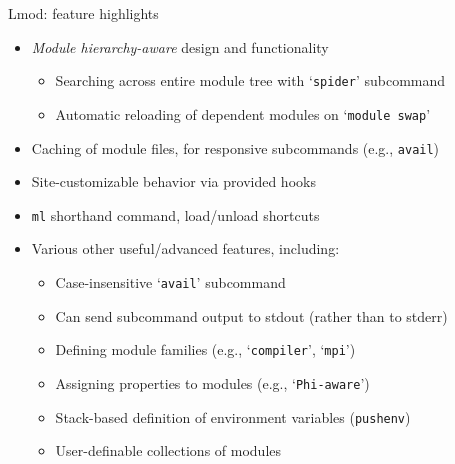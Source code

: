 \documentclass[10pt,xcolor={usenames,dvipsnames}]{beamer}
\begin{document}
\begin{frame}{Lmod: feature highlights}
\begin{itemize}
    \item
        \emph{Module hierarchy-aware} design and functionality
    \begin{itemize}
        \item
            Searching across entire module tree with `\texttt{spider}' subcommand
        \item
            Automatic reloading of dependent modules on `\texttt{module swap}'
    \end{itemize}
    \item
        Caching of module files, for responsive subcommands
        (e.g., \texttt{avail})
    \item
        Site-customizable behavior via provided hooks
    \item
        \texttt{ml} shorthand command, load/unload shortcuts
    \item
        Various other useful/advanced features, including:
    \begin{itemize}
        \item
            Case-insensitive `\texttt{avail}' subcommand
        \item
            Can send subcommand output to stdout (rather than to stderr)
        \item
            Defining module families (e.g., `\texttt{compiler}', `\texttt{mpi}')
        \item
            Assigning properties to modules (e.g., `\texttt{Phi-aware}')
        \item
            Stack-based definition of environment variables (\texttt{pushenv})
        \item
            User-definable collections of modules
    \end{itemize}
\end{itemize}
\end{frame}

\end{document}
